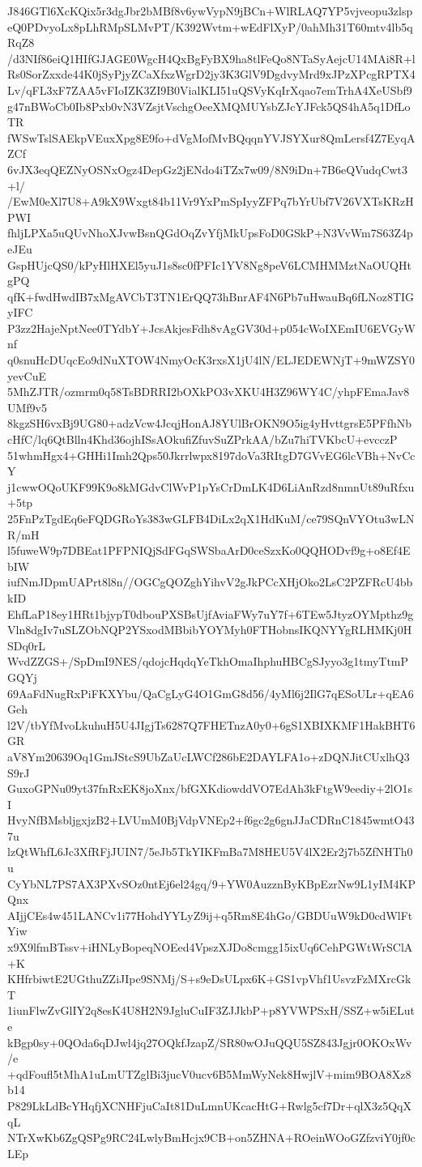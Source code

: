J846GTl6XcKQix5r3dgJbr2bMBf8v6ywVypN9jBCn+WlRLAQ7YP5vjveopu3zlsp
eQ0PDvyoLx8pLhRMpSLMvPT/K392Wvtm+wEdFlXyP/0ahMh31T60mtv4lb5qRqZ8
/d3NIf86eiQ1HIfGJAGE0WgcH4QxBgFyBX9ha8tlFeQo8NTaSyAejcU14MAi8R+l
Rs0SorZxxde44K0jSyPjyZCaXfxzWgrD2jy3K3GlV9DgdvyMrd9xJPzXPcgRPTX4
Lv/qFL3xF7ZAA5vFIoIZK3ZI9B0VialKLI51uQSVyKqIrXqao7emTrhA4XeUSbf9
g47nBWoCb0Ib8Pxb0vN3VZsjtVschgOeeXMQMUYsbZJcYJFck5QS4hA5q1DfLoTR
fWSwTslSAEkpVEuxXpg8E9fo+dVgMofMvBQqqnYVJSYXur8QmLersf4Z7EyqAZCf
6vJX3eqQEZNyOSNxOgz4DepGz2jENdo4iTZx7w09/8N9iDn+7B6eQVudqCwt3+l/
/EwM0eXl7U8+A9kX9Wxgt84b11Vr9YxPmSpIyyZFPq7bYrUbf7V26VXTsKRzHPWI
fhljLPXa5uQUvNhoXJvwBsnQGdOqZvYfjMkUpsFoD0GSkP+N3VvWm7S63Z4peJEu
GspHUjcQS0/kPyHlHXEl5yuJ1s8sc0fPFIc1YV8Ng8peV6LCMHMMztNaOUQHtgPQ
qfK+fwdHwdIB7xMgAVCbT3TN1ErQQ73hBnrAF4N6Pb7uHwauBq6fLNoz8TIGyIFC
P3zz2HajeNptNee0TYdbY+JcsAkjesFdh8vAgGV30d+p054cWoIXEmIU6EVGyWnf
q0snuHcDUqcEo9dNuXTOW4NmyOcK3rxsX1jU4lN/ELJEDEWNjT+9mWZSY0yevCuE
5MhZJTR/ozmrm0q58TsBDRRI2bOXkPO3vXKU4H3Z96WY4C/yhpFEmaJav8UMf9v5
8kgzSH6vxBj9UG80+adzVcw4JcqjHonAJ8YUlBrOKN9O5ig4yHvttgrsE5PFfhNb
cHfC/lq6QtBlln4Khd36ojhISsAOkufiZfuvSuZPrkAA/bZu7hiTVKbcU+evcczP
51whmHgx4+GHHi1Imh2Qps50Jkrrlwpx8197doVa3RItgD7GVvEG6lcVBh+NvCcY
j1cwwOQoUKF99K9o8kMGdvClWvP1pYsCrDmLK4D6LiAnRzd8nmnUt89uRfxu+5tp
25FnPzTgdEq6eFQDGRoYs383wGLFB4DiLx2qX1HdKuM/ce79SQnVYOtu3wLNR/mH
l5fuweW9p7DBEat1PFPNIQjSdFGqSWSbaArD0ceSzxKo0QQHODvf9g+o8Ef4EbIW
iufNmJDpmUAPrt8l8n//OGCgQOZghYihvV2gJkPCcXHjOko2LsC2PZFRcU4bbkID
EhfLaP18ey1HRt1bjypT0dbouPXSBsUjfAviaFWy7uY7f+6TEw5JtyzOYMpthz9g
Vln8dgIv7uSLZObNQP2YSxodMBbibYOYMyh0FTHobnsIKQNYYgRLHMKj0HSDq0rL
WvdZZGS+/SpDmI9NES/qdojcHqdqYeTkhOmaIhphuHBCgSJyyo3g1tmyTtmPGQYj
69AaFdNugRxPiFKXYbu/QaCgLyG4O1GmG8d56/4yMl6j2IlG7qESoULr+qEA6Geh
l2V/tbYfMvoLkuhuH5U4JIgjTs6287Q7FHETnzA0y0+6gS1XBIXKMF1HakBHT6GR
aV8Ym20639Oq1GmJStcS9UbZaUcLWCf286bE2DAYLFA1o+zDQNJitCUxlhQ3S9rJ
GuxoGPNu09yt37fnRxEK8joXnx/bfGXKdiowddVO7EdAh3kFtgW9eediy+2lO1sI
HvyNfBMsbljgxjzB2+LVUmM0BjVdpVNEp2+f6gc2g6gnJJaCDRnC1845wmtO437u
lzQtWhfL6Jc3XfRFjJUIN7/5eJb5TkYIKFmBa7M8HEU5V4lX2Er2j7b5ZfNHTh0u
CyYbNL7PS7AX3PXvSOz0ntEj6el24gq/9+YW0AuzznByKBpEzrNw9L1yIM4KPQnx
AIjjCEs4w451LANCv1i77HohdYYLyZ9ij+q5Rm8E4hGo/GBDUuW9kD0cdWlFtYiw
x9X9lfmBTssv+iHNLyBopeqNOEed4VpszXJDo8cmgg15ixUq6CehPGWtWrSClA+K
KHfrbiwtE2UGthuZZiJIpe9SNMj/S+s9eDsULpx6K+GS1vpVhf1UsvzFzMXrcGkT
1iunFlwZvGlIY2q8esK4U8H2N9JgluCuIF3ZJJkbP+p8YVWPSxH/SSZ+w5iELute
kBgp0sy+0QOda6qDJwl4jq27OQkfJzapZ/SR80wOJuQQU5SZ843Jgjr0OKOxWv/e
+qdFoufl5tMhA1uLmUTZglBi3jucV0ucv6B5MmWyNek8HwjlV+mim9BOA8Xz8b14
P829LkLdBcYHqfjXCNHFjuCaIt81DuLmnUKcacHtG+Rwlg5cf7Dr+qlX3z5QqXqL
NTrXwKb6ZgQSPg9RC24LwlyBmHcjx9CB+on5ZHNA+ROeinWOoGZfzviY0jf0cLEp
